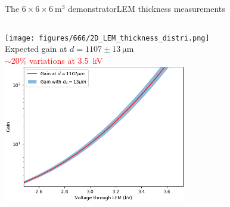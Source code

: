 \documentclass[10pt]{beamer}
\begin{document}
\begin{frame}{The \texorpdfstring{$6 \times 6 \times \SI{6}{\meter\cubed}$}{666} demonstrator}{LEM thickness measurements}
\begin{scriptsize}
\begin{columns}
\begin{column}{0.48\textwidth}
    				\texttt{[image: figures/666/2D\_LEM\_thickness\_distri.png]}\\
    				\vfill
    				\centering
    				Expected gain at $d=1107\pm\SI{13}{\micro\meter}$\\
    				\textcolor{red}{$\sim 20\%$ variations at \SI{3.5}{\kilo\volt}}\\
    				\includegraphics[width=0.6\textwidth]{figures/666/measured_gain_fluctuations.png}
    			\end{column}
    		\end{columns}
    	\end{scriptsize}
    \end{frame}
    
{
	\begin{frame}[plain]
		
	\end{frame}
}
    
\end{document}
